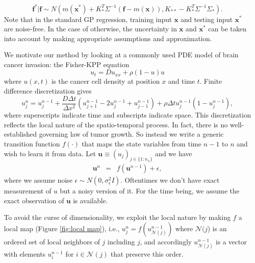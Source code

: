 \documentclass[smallextended,natbib]{svjour3}       %
\begin{document}
\begin{equation}
\mathbf{f}^{*}\vert\mathbf{f}\sim N(m(\mathbf{x}^{*})+K_{*}^{T}\Sigma^{-1}(\mathbf{f}-m(\mathbf{x})),K_{**}-K_{*}^{T}\Sigma^{-1}\Sigma_{*}). \label{eq:f|f*}
\end{equation}
Note that in the standard GP regression, training input $\mathbf{x}$ and testing input $\mathbf{x}^{*}$ are noise-free. In the case of otherwise, the uncertainty in $\mathbf{x}$ and $\mathbf{x}^{*}$ can be taken into account by making appropriate assumptions and approximation. 


We motivate our method by looking at a commonly used PDE model of brain cancer invasion: the Fisher-KPP equation
\[
u_{t}=Du_{xx}+\rho (1-u)u
\]
where $u(x,t)$ is the cancer cell density at position $x$ and time $t$. Finite difference discretization gives 
\[
u_{j}^{n}=u_{j}^{n-1}+\frac{D \Delta t}{\Delta x^{2}}(u_{j+1}^{n-1}-2u_{j}^{n-1}+u_{j-1}^{n-1})+\rho \Delta t u_{j}^{n-1}(1-u_{j}^{n-1}),
\]
where superscripts indicate time and subscripts indicate space. This discretization reflects the local nature of the spatio-temporal process. In fact, there is no well-established governing law of tumor growth. So instead we write a generic transition function $f(\cdot)$ that maps the state variables from time $n-1$ to $n$ and wish to learn it from data. Let $\mathbf{u}\equiv(u_{j})_{j\in\{1:n_{x}\}}$ and we have 
\begin{eqnarray}
\mathbf{u}^{n} & = & f(\mathbf{u}^{n-1})+\epsilon\label{eq:un=00003Df(un-1)},
\end{eqnarray}
where we assume noise $\epsilon\sim N(0,\sigma_{\epsilon}^{2}I)$. Oftentimes we don't have exact measurement of $u$ but a noisy version of it. For the time being, we assume the exact observation of $\mathbf{u}$ is available.

To avoid the curse of dimensionality, we exploit the local nature by making $f$ a local map (Figure \ref{fig:local map}), i.e., $u_{j}^{n}=f(u_{\mathcal{N}(j)}^{n-1})$ where $\mathcal{N}(j$) is an ordered set of local neighbors of $j$ including $j$, and accordingly $u_{\mathcal{N}(j)}^{n-1}$ is a vector with elements $u_{i}^{n-1}$ for $i\in\mathcal{N}(j)$ that preserve this order.
\end{document}
